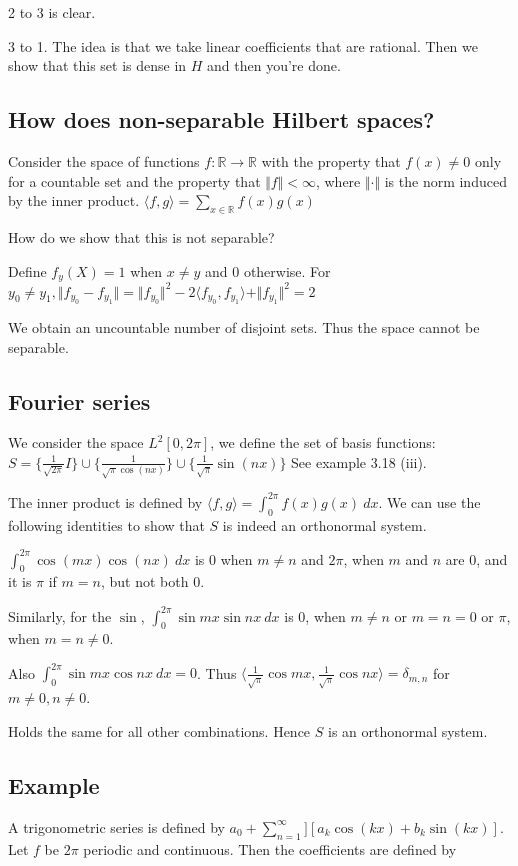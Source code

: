 \documentclass[11pt]{article}
\def\R{\mathbb{R}}
\begin{document}
2 to 3 is clear.

3 to 1. The idea is that we take linear coefficients that are rational. Then
we show that this set is dense in \(H\) and then you're done.
\subsection{How does non-separable Hilbert spaces?}
\label{sec:org6ce4400}
Consider the space of functions \(f\colon \R \rightarrow \R\) with the property
that \(f(x)\neq 0\) only for a countable set and the property that \(\Vert f
   \Vert < \infty\), where \(\Vert \cdot \Vert\) is the norm induced by the inner
product. \(\langle f, g \rangle = \sum_{x\in \R} f(x)g(x)\)

How do we show that this is not separable? 

Define \(f_y(X) = 1\) when \(x \neq y\) and \(0\) otherwise. For \(y_0 \neq y_1,
   \Vert f_{y_0} - f_{y_1} \Vert = \Vert f_{y_0}\Vert^2 - 2\langle f_{y_0},
   f_{y_1}\rangle + \Vert f_{y_1}\Vert^2 = 2\)

We obtain an uncountable number of disjoint sets. Thus the space cannot be
separable.
\subsection{Fourier series}
\label{sec:orge406c33}
We consider the space \(L^2[0, 2\pi]\), we define the set of basis functions:
\(S = \{\frac{1}{\sqrt{2\pi}} I\} \cup \{\frac{1}{\sqrt{\pi} \cos(nx)}\} \cup
   \{\frac{1}{\sqrt{\pi}}\sin(nx)\}\) See example 3.18 (iii).

The inner product is defined by \(\langle f, g \rangle = \int_0^{2\pi}
   f(x)g(x)\ dx\). We can use the following identities to show that \(S\) is indeed
an orthonormal system.

\(\int_0^{2\pi} \cos(mx) \cos(nx)\ dx\) is \(0\) when \(m\neq n\) and \(2\pi\), when
\(m\) and \(n\) are \(0\), and it is \(\pi\) if \(m = n\), but not both \(0\).

Similarly, for the \(\sin\), \(\int_{0}^{2\pi} \sin{mx}\sin{nx}\ dx\) is \(0\),
when \(m\neq n\) or \(m=n=0\) or \(\pi\), when \(m=n\neq 0\).

Also \(\int_0^{2\pi} \sin mx \cos nx\ dx = 0\). Thus \(\langle
   \frac{1}{\sqrt{\pi}} \cos mx, \frac{1}{\sqrt{\pi}} \cos nx\rangle =
   \delta_{m, n}\) for \(m \neq 0, n \neq 0\).

Holds the same for all other combinations. Hence \(S\) is an orthonormal
system.
\subsection{Example}
\label{sec:org2ad9ad3}
A trigonometric series is defined by \(a_0 + \sum_{n=1}^\infty][a_k \cos(kx) +
   b_k \sin(kx)]\). Let \(f\) be \(2\pi\) periodic and continuous. Then the
coefficients are defined by
\end{document}
